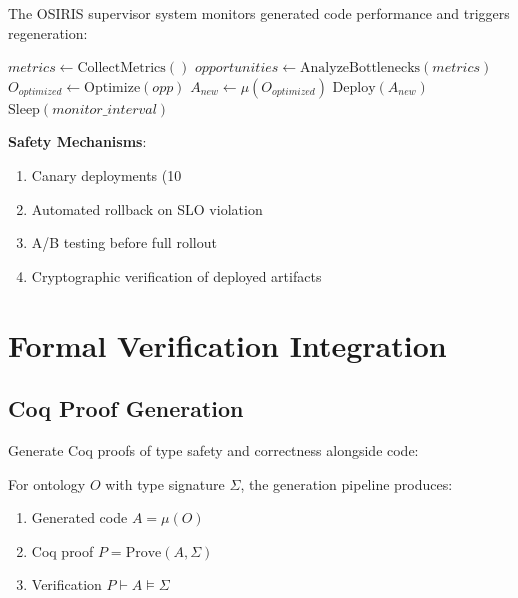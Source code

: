 The OSIRIS supervisor system monitors generated code performance and triggers regeneration:

\begin{algorithm}
\caption{OSIRIS Performance Loop}
\begin{algorithmic}[1]
    \State $metrics \gets \text{CollectMetrics}()$
        \State $opportunities \gets \text{AnalyzeBottlenecks}(metrics)$
            \State $O_{optimized} \gets \text{Optimize}(opp)$
            \State $A_{new} \gets \mu(O_{optimized})$
            \State $\text{Deploy}(A_{new})$
        \EndFor
    \EndIf
    \State $\text{Sleep}(monitor\_interval)$
\EndWhile
\EndProcedure
\end{algorithmic}
\end{algorithm}

\textbf{Safety Mechanisms}:
\begin{enumerate}
    \item Canary deployments (10%
    \item Automated rollback on SLO violation
    \item A/B testing before full rollout
    \item Cryptographic verification of deployed artifacts
\end{enumerate}

\section{Formal Verification Integration}

\subsection{Coq Proof Generation}

Generate Coq proofs of type safety and correctness alongside code:

\begin{theorem}
    For ontology $O$ with type signature $\Sigma$, the generation pipeline produces:
    \begin{enumerate}
        \item Generated code $A = \mu(O)$
        \item Coq proof $P = \text{Prove}(A, \Sigma)$
        \item Verification $P \vdash A \models \Sigma$
    \end{enumerate}
\end{theorem}

